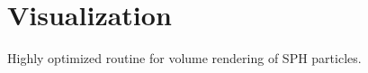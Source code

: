 \section{Visualization}
\label{visualization}

Highly optimized routine for volume rendering of SPH particles.